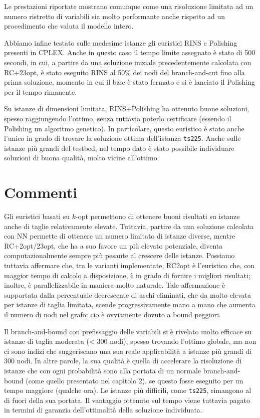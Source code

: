 Le prestazioni riportate mostrano comunque come una risoluzione limitata ad un numero ristretto di variabili sia molto performante anche rispetto ad un procedimento che valuta il modello intero. 

Abbiamo infine testato sulle medesime istanze gli euristici RINS e Polishing presenti in CPLEX. Anche in questo caso il tempo limite assegnato è stato di 500 secondi, in cui, a partire da una soluzione iniziale precedentemente calcolata con RC+23opt, è stato eseguito RINS al 50\% dei nodi del branch-and-cut fino alla prima soluzione, momento in cui il b\&c è stato fermato e si è lanciato il Polishing per il tempo rimanente.

Su istanze di dimensioni limitata, RINS+Polishing ha ottenuto buone soluzioni, spesso raggiungendo l’ottimo, senza tuttavia poterlo certificare (essendo il Polishing un algoritmo genetico). In particolare, questo euristico è stato anche l’unico in grado di trovare la soluzione ottima dell’istanza \texttt{ts225}. Anche sulle istanze più grandi del testbed, nel tempo dato è stato possibile individuare soluzioni di buona qualità, molto vicine all’ottimo.

\section{Commenti}
Gli euristici basati su $k$-opt permettono di ottenere buoni risultati su istanze anche di taglie relativamente elevate. Tuttavia, partire da una soluzione calcolata con NN permette di ottenere un numero limitato di istanze diverse, mentre RC+2opt/23opt, che ha a suo favore un più elevato potenziale, diventa computazionalmente sempre più pesante al crescere delle istanze. Possiamo tuttavia affermare che, tra le varianti implementate, RC2opt è l’euristico che, con maggior tempo di calcolo a disposizione, è in grado di fornire i migliori risultati; inoltre, è parallelizzabile in maniera molto naturale. Tale affermazione è supportata dalla percentuale decrescente di archi eliminati, che da molto elevata per istanze di taglia limitata, scende progressivamente mano a mano che aumenta il numero di nodi nel grafo: cio è ovviamente dovuto a bound peggiori.

Il branch-and-bound con prefissaggio delle variabili si è rivelato molto efficace su istanze di taglia moderata (< 300 nodi), spesso trovando l’ottimo globale, ma non ci sono indizi che suggeriscano una sua reale applicabilità a istanze più grandi di 300 nodi. In altre parole, la sua qualità è quella di accelerare la risoluzione di istanze che con ogni probabilità sono alla portata di un normale branch-and-bound (come quello presentato nel capitolo 2), se questo fosse eseguito per un tempo maggiore (qualche ora). Le istanze più difficili, come \texttt{ts225}, rimangono al di fuori della sua portata. Il vantaggio ottenuto sul tempo viene tuttavia pagato in termini di garanzia dell’ottimalità della soluzione individuata.

